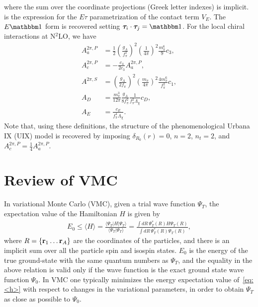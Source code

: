 \documentclass[aps,prc,twocolumn,superscriptaddress,showpacs,floatfix,nofootinbib]{revtex4-1}
\begin{document}
where the sum over the coordinate projections (Greek letter indexes) is implicit.
 is the expression for the $E\tau$ parametrization of the contact term $V_E$.
The $E\mathbbm1$ form is recovered setting $\bm{\tau}_i\cdot\bm{\tau}_j=\mathbbm1$.
For the local chiral interactions at N$^2$LO, we have
\begin{align}
A_a^{2\pi,P}&=\frac{1}{2}\left(\frac{g_A}{f_\pi^2}\right)^2\left(\frac{1}{4\pi}\right)^2
\frac{m_\pi^6}{9}c_3 \nonumber, \\
A_c^{2\pi,P}&=-\frac{c_4}{2c_3}A_a^{2\pi,P} \nonumber, \\
A^{2\pi,S}&=\left(\frac{g_A}{2f_\pi}\right)^2\left(\frac{m_\pi}{4\pi}\right)^2\frac{4m_\pi^6}{f_\pi^2}c_1
\nonumber, \\
A_D&=\frac{m_\pi^3}{12\pi}\frac{g_A}{8f_\pi^2}\frac{1}{f_\pi^2\Lambda_\chi}c_D
\nonumber, \\
A_E&=\frac{c_E}{f_\pi^4\Lambda_\chi}.
\end{align}
Note that, using these definitions, the structure of the phenomenological Urbana IX (UIX) model
is recovered by imposing $\delta_{R_0}(r)=0$, $n=2$, $n_t=2$, and $A_c^{2\pi,P}=\frac{1}{4}A_a^{2\pi,P}$.


\section{Review of VMC}
\label{sec:vmc}
In variational Monte Carlo (VMC), given a trial wave function $\Psi_T$,
the expectation value of the Hamiltonian $H$ is given by
\begin{align}
\!\!\!E_0\leq\langle H\rangle=\frac{\langle\Psi_T|H|\Psi_T\rangle}{\langle\Psi_T|\Psi_T\rangle}
=\frac{\displaystyle\int\!dR\,\Psi_T^*(R)H\Psi_T(R)}
{\displaystyle\int\!dR\,\Psi_T^*(R)\Psi_T(R)} ,
\label{eq:<h>}
\end{align}
where $R=\{\vb{r}_1\dots\vb{r}_A\}$ are the coordinates of the particles, and there is an 
implicit sum over all the particle spin and isospin states. 
$E_0$ is the energy of the true ground-state with the same quantum numbers as $\Psi_T$, 
and the equality in the above relation is valid only if the wave function is the exact
ground state wave function $\Psi_0$. In VMC one typically minimizes the energy expectation 
value of~\cref{eq:<h>} with respect to changes in the variational parameters, in order to 
obtain $\Psi_T$ as close as possible to $\Psi_0$. 
\end{document}

